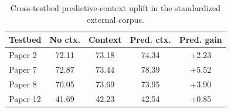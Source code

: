 \documentclass[conference]{IEEEtran}
\begin{document}
\begin{table}[t]
\caption{Cross-testbed predictive-context uplift in the standardized external
corpus.}
\label{tab:paper_context_uplift}
\centering
\small
\setlength{\tabcolsep}{4pt}
\begin{tabular}{lcccc}
\toprule
\textbf{Testbed} & \textbf{No ctx.} & \textbf{Context} & \textbf{Pred. ctx.} & \textbf{Pred. gain} \\
\midrule
Paper 2 & 72.11 & 73.18 & 74.34 & +2.23 \\
Paper 7 & 72.87 & 73.44 & 78.39 & +5.52 \\
Paper 8 & 70.05 & 73.69 & 73.95 & +3.90 \\
Paper 12 & 41.69 & 42.23 & 42.54 & +0.85 \\
\bottomrule
\end{tabular}
\end{table}
\end{document}
